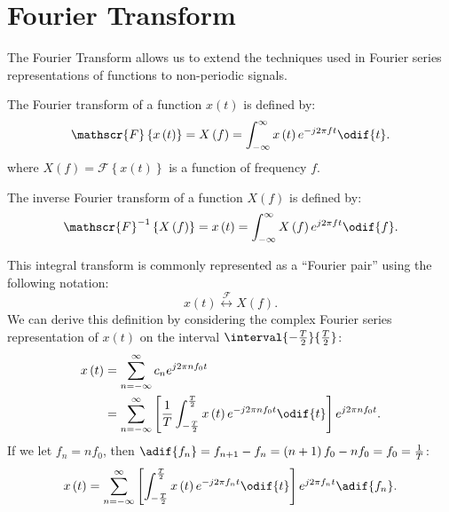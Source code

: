 \documentclass{article}
\begin{document}
\section{Fourier Transform}
The Fourier Transform allows us to extend the techniques used in Fourier series representations of functions
to non-periodic signals.
\begin{definition}
    The Fourier transform of a function \(x\left( t \right)\) is defined by:
    \begin{equation*}
        \mathscr{F}\left\{ x\left( t \right) \right\} = X\left( f \right) = \int_{-\infty}^\infty x\left( t \right) e^{-j 2\pi f t} \odif{t}.
    \end{equation*}
    where \(X\left( f \right) = \mathscr{F}\left\{ x\left( t \right) \right\}\) is a function of frequency \(f\).
\end{definition}
\begin{definition}
    The inverse Fourier transform of a function \(X\left( f \right)\) is defined by:
    \begin{equation*}
        \mathscr{F}^{-1}\left\{ X\left( f \right) \right\} = x\left( t \right) = \int_{-\infty}^\infty X\left( f \right) e^{j 2\pi f t} \odif{f}.
    \end{equation*}
\end{definition}
This integral transform is commonly represented as a ``Fourier pair'' using the following notation:
\begin{equation*}
    x\left( t \right) \overset{\mathscr{F}}{\longleftrightarrow} X\left( f \right).
\end{equation*}
We can derive this definition by considering the complex Fourier series representation of \(x\left( t \right)\)
on the interval \(\interval{-\frac{T}{2}}{\frac{T}{2}}\):
\begin{align*}
    x\left( t \right) & = \sum_{n = -\infty}^\infty c_n e^{j 2\pi n f_0 t}                                                                                                          \\
                      & = \sum_{n = -\infty}^\infty \left[ \frac{1}{T} \int_{-\frac{T}{2}}^{\frac{T}{2}} x\left( t \right) e^{-j 2\pi n f_0 t} \odif{t} \right] e^{j 2\pi n f_0 t}.
\end{align*}
If we let \(f_n = n f_0\), then \(\adif{f_n} = f_{n + 1} - f_n = \left( n + 1 \right)f_0 - n f_0 = f_0 = \frac{1}{T}\):
\begin{equation*}
    x\left( t \right) = \sum_{n = -\infty}^\infty \left[ \int_{-\frac{T}{2}}^{\frac{T}{2}} x\left( t \right) e^{-j 2\pi f_n t} \odif{t} \right] e^{j 2\pi f_n t} \adif{f_n}.
\end{equation*}
\end{document}

